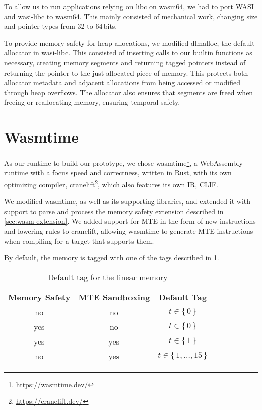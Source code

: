 To allow us to run applications relying on libc on wasm64, we had to port \ac{WASI} and wasi-libc to wasm64.
This mainly consisted of mechanical work, changing size and pointer types from 32 to 64\,bits.

To provide memory safety for heap allocations, we modified dlmalloc, the default allocator in wasi-libc.
This consisted of inserting calls to our builtin functions as necessary, creating memory segments and returning tagged pointers instead of returning the pointer to the just allocated piece of memory.
This protects both allocator metadata and adjacent allocations from being accessed or modified through heap overflows.
The allocator also ensures that segments are freed when freeing or reallocating memory, ensuring temporal safety.

\section{Wasmtime}
\label{sec:wasm-runtime}

As our runtime to build our prototype, we chose wasmtime\footnote{\url{https://wasmtime.dev/}}, a WebAssembly runtime with a focus speed and correctness, written in Rust, with its own optimizing compiler, cranelift\footnote{\url{https://cranelift.dev/}}, which also features its own \ac{IR}, \ac{CLIF}.

We modified wasmtime, as well as its supporting libraries, and extended it with support to parse and process the memory safety extension described in \cref{sec:wasm-extension}.
We added support for \ac{MTE} in the form of new instructions and lowering rules to cranelift, allowing wasmtime to generate \ac{MTE} instructions when compiling for a target that supports them.

By default, the memory is tagged with one of the tags described in \cref{tab:default-tag}.

\begin{table}
  \centering
  \begin{tabular}{c | c || c}
    \textbf{Memory Safety} & \textbf{MTE Sandboxing} & \textbf{Default Tag} \\
    \hline
    no & no & $t \in \{\,0\,\}$ \\
    yes & no & $t \in \{\,0\,\}$ \\
    yes & yes & $t \in \{\,1\,\}$ \\
    no & yes & $t \in \{\,1, \dots, 15\,\}$
  \end{tabular}
  \caption{Default tag for the linear memory}
  \label{tab:default-tag}
\end{table}

